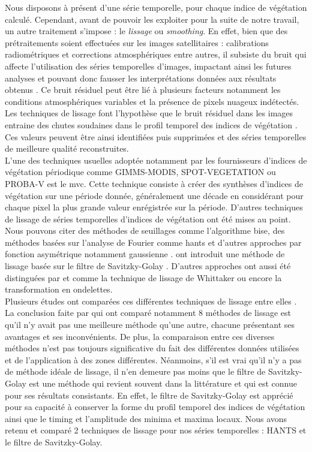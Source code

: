 Nous disposons \`a présent d'une série temporelle, pour chaque indice de végétation calculé. Cependant, avant de pouvoir les exploiter pour la suite de notre travail, un autre 
traitement s'impose : le \emph{lissage} ou \emph{smoothing}. En effet, bien que des prétraitements soient effectuées sur les images satellitaires : calibrations radiométriques et 
corrections atmosphériques entre autres, il subsiste du bruit qui affecte l'utilisation des séries temporelles d'images, impactant ainsi les futures analyses et pouvant donc fausser les interprétations
données aux résultats obtenus \citep{Chen2004}. Ce bruit résiduel peut être lié à plusieurs facteurs notamment les conditions atmosphériques variables et la présence de pixels nuageux
indétectés. Les techniques de lissage font l'hypothèse que le bruit résiduel dans les images entraine des chutes soudaines dans le profil temporel des indices de végétation 
\citep{Bojanowski2009}. Ces valeurs peuvent être ainsi identifiées puis supprimées et des séries temporelles de meilleure qualité reconstruites.
\\L'une des techniques usuelles adoptée notamment par les fournisseurs d'indices de végétation périodique comme GIMMS-MODIS, SPOT-VEGETATION ou PROBA-V est le \acrshort{mvc}. Cette technique 
consiste à créer des synthèses d'indices de végétation sur une période donnée, généralement une décade en considérant pour chaque pixel la plus grande valeur enrégistrée sur la période.
D'autres techniques de lissage de séries temporelles d'indices de végétation ont été mises au point. Nous pouvons citer des méthodes de seuillages comme l'algorithme \acrshort{bise}, 
des méthodes basées sur l'analyse de Fourier comme \acrshort{hants} \citep{Verhoef1996} et d'autres approches par fonction asymétrique notamment gaussienne \citep{Jonsson2002}. 
\citet{Chen2004} ont introduit une méthode de lissage basée sur le filtre de Savitzky-Golay \citep{Savitzky1964}. D'autres approches ont aussi été distinguées par \citet{Geng2014} et 
\citet{Liu2017} comme la technique de lissage de Whittaker ou encore la transformation en ondelettes.
\\Plusieurs études ont comparées ces différentes techniques de lissage entre elles \citep{Jonsson2002,Chen2004,Hird2009,Geng2014,Shao2016,Liu2017}. La conclusion faite par \citet{
Geng2014} qui ont comparé notamment 8 méthodes de lissage est qu'il n'y avait pas une meilleure méthode qu'une autre, chacune présentant ses avantages et ses inconvénients. De plus, la
comparaison entre ces diverses méthodes n'est pas toujours significative du fait des différentes données utilisées et de l'application à des zones différentes. Néanmoins, s'il est vrai qu'il n'y 
a pas de méthode idéale de lissage, il n'en demeure pas moins que le filtre de Savitzky-Golay est une méthode qui revient souvent dans la littérature et qui est connue pour ses 
résultats consistants. En effet, le filtre de Savitzky-Golay est apprécié pour sa capacité à conserver la forme du profil temporel des indices de végétation ainsi que le timing et 
l'amplitude des minima et maxima locaux. Nous avons retenu et comparé 2 techniques de lissage pour nos séries temporelles : HANTS et le filtre de Savitzky-Golay.

